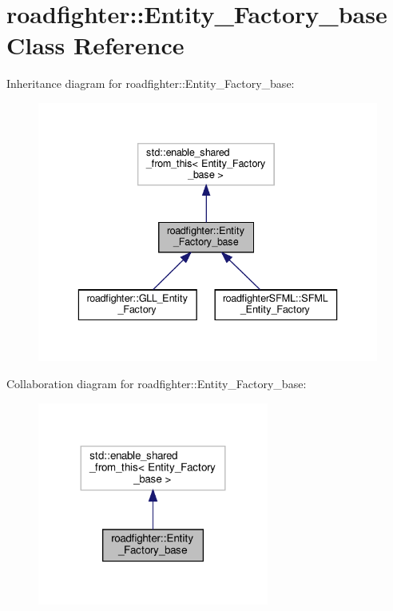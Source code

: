 \hypertarget{classroadfighter_1_1Entity__Factory__base}{}\section{roadfighter\+:\+:Entity\+\_\+\+Factory\+\_\+base Class Reference}
\label{classroadfighter_1_1Entity__Factory__base}


Inheritance diagram for roadfighter\+:\+:Entity\+\_\+\+Factory\+\_\+base\+:
\nopagebreak
\begin{figure}[H]
\begin{center}
\leavevmode
\includegraphics[width=336pt]{classroadfighter_1_1Entity__Factory__base__inherit__graph}
\end{center}
\end{figure}


Collaboration diagram for roadfighter\+:\+:Entity\+\_\+\+Factory\+\_\+base\+:\nopagebreak
\begin{figure}[H]
\begin{center}
\leavevmode
\includegraphics[width=215pt]{classroadfighter_1_1Entity__Factory__base__coll__graph}
\end{center}
\end{figure}
